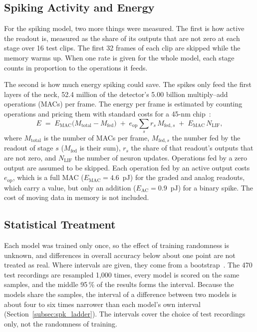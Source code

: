 \documentclass[11pt, a4paper]{report}
\begin{document}
\subsection{Spiking Activity and Energy}
\label{subsec:eval_spk}
For the spiking model, two more things were measured. The first is how active the readout is, measured as the share of its outputs that are not zero at each stage over 16 test clips. The first 32 frames of each clip are
skipped while the memory warms up. When one rate is given for the whole model, each stage counts in
proportion to the operations it feeds.

The second is how much energy spiking could save. The spikes only feed the first layers of the neck,
52.4 million of the detector's 5.00 billion multiply--add operations (MACs) per frame. The energy per frame
is estimated by counting operations and pricing them with standard costs for a 45-nm
chip~\cite{horowitz2014computing}:
\begin{equation}
  E \;=\; E_{\mathrm{MAC}}\big(M_{\mathrm{total}} - M_{\mathrm{fed}}\big)
     \;+\; e_{\mathrm{op}} \sum_{s} r_s\, M_{\mathrm{fed},s}
     \;+\; E_{\mathrm{MAC}}\, N_{\mathrm{LIF}},
  \label{eq:sop_energy}
\end{equation}
where $M_{\mathrm{total}}$ is the number of MACs per frame, $M_{\mathrm{fed},s}$ the number fed by the
readout of stage $s$ ($M_{\mathrm{fed}}$ is their sum), $r_s$ the share of that readout's outputs that are
not zero, and $N_{\mathrm{LIF}}$ the number of neuron updates. Operations fed by a zero output are assumed to
be skipped. Each operation fed by an active output costs $e_{\mathrm{op}}$, which is a full MAC
($E_{\mathrm{MAC}} = 4.6$~pJ) for the graded and analog readouts, which carry a value, but only an addition
($E_{\mathrm{AC}} = 0.9$~pJ) for a binary spike. The cost of moving data in memory is not included.

\subsection{Statistical Treatment}
\label{subsec:eval_stats}
Each model was trained only once, so the effect of training randomness is unknown, and differences in
overall accuracy below about one point are not treated as real. Where intervals are given, they come from a
bootstrap~\cite{efron1993introduction}. The 470 test recordings are resampled 1{,}000 times, every model is
scored on the same samples, and the middle 95\,\% of the results forms the interval. Because the models
share the samples, the interval of a difference between two models is about four to six times narrower than
each model's own interval (Section~\ref{subsec:spk_ladder}). The intervals cover the choice of test
recordings only, not the randomness of training.
\newpage
\end{document}
